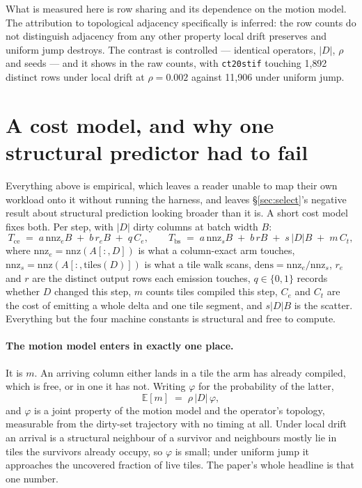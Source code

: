 \documentclass{article}
\begin{document}
What is measured here is row sharing and its dependence on the motion model.
The attribution to topological adjacency specifically is inferred: the row
counts do not distinguish adjacency from any other property local drift
preserves and uniform jump destroys. The contrast is controlled --- identical
operators, $|D|$, $\rho$ and seeds --- and it shows in the raw counts, with
\texttt{ct20stif} touching 1{,}892 distinct rows under local drift at
$\rho{=}0.002$ against 11{,}906 under uniform jump.

\section{A cost model, and why one structural predictor had to fail}
\label{sec:model}

Everything above is empirical, which leaves a reader unable to map their own
workload onto it without running the harness, and leaves \S\ref{sec:select}'s
negative result about structural prediction looking broader than it is. A short
cost model fixes both. Per step, with $|D|$ dirty columns at batch width $B$:
\[
  T_{\text{ce}} \;=\; a\,\mathrm{nnz}_e B \;+\; b\, r_e B \;+\; q\,C_e,
  \qquad
  T_{\text{bs}} \;=\; a\,\mathrm{nnz}_s B \;+\; b\, r B \;+\; s\,|D|B \;+\; m\,C_t,
\]
where $\mathrm{nnz}_e = \mathrm{nnz}(A[:,D])$ is what a column-exact arm touches,
$\mathrm{nnz}_s = \mathrm{nnz}(A[:,\mathrm{tiles}(D)])$ is what a tile walk
scans, $\mathrm{dens} = \mathrm{nnz}_e/\mathrm{nnz}_s$, $r_e$ and $r$ are the
distinct output rows each emission touches, $q \in \{0,1\}$ records whether $D$
changed this step, $m$ counts tiles compiled this step, $C_e$ and $C_t$ are the
cost of emitting a whole delta and one tile segment, and $s|D|B$ is the scatter.
Everything but the four machine constants is structural and free to compute.

\paragraph{The motion model enters in exactly one place.}
It is $m$. An arriving column either lands in a tile the arm has already
compiled, which is free, or in one it has not. Writing $\varphi$ for the
probability of the latter,
\[
  \mathbb{E}[m] \;=\; \rho\,|D|\,\varphi ,
\]
and $\varphi$ is a joint property of the motion model and the operator's
topology, measurable from the dirty-set trajectory with no timing at all. Under
local drift an arrival is a structural neighbour of a survivor and neighbours
mostly lie in tiles the survivors already occupy, so $\varphi$ is small; under
uniform jump it approaches the uncovered fraction of live tiles. The paper's
whole headline is that one number.
\end{document}
